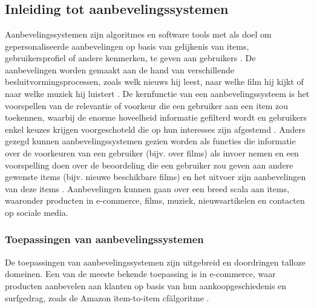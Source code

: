 \chapter{}%
\label{ch:stand-van-zaken}



\section{Inleiding tot aanbevelingssystemen}
Aanbevelingssystemen zijn algoritmes en software tools met als doel om gepersonaliseerde aanbevelingen op basis van gelijkenis van items, gebruikersprofiel of andere kenmerken, te geven aan gebruikers \autocite{Patel2020, Patel2023}. De aanbevelingen worden gemaakt aan de hand van verschillende besluitvormingsprocessen, zoals welk nieuws hij leest, naar welke film hij kijkt of naar welke muziek hij luistert \autocite{Patel2017}. De kernfunctie van een aanbevelingssysteem is het voorspellen van de relevantie of voorkeur die een gebruiker aan een item zou toekennen, waarbij de enorme hoveelheid informatie gefilterd wordt en gebruikers enkel keuzes krijgen voorgeschoteld die op hun interesses zijn afgestemd \autocite{Fkih2022}. Anders gezegd kunnen aanbevelingssystemen gezien worden als functies die informatie over de voorkeuren van een gebruiker (bijv. over films) als invoer nemen en een voorspelling doen over de beoordeling die een gebruiker zou geven aan andere gewenste items (bijv. nieuwe beschikbare films) en het uitvoer zijn aanbevelingen van deze items \autocite{Milano2020}. Aanbevelingen kunnen gaan over een breed scala aan items, waaronder producten in e-commerce, films, muziek, nieuwsartikelen en contacten op sociale media.
\subsection{Toepassingen van aanbevelingssystemen}
De toepassingen van aanbevelingssystemen zijn uitgebreid en doordringen talloze domeinen. Een van de meeste bekende toepassing is in e-commerce, waar producten aanbevelen aan klanten op basis van hun aankoopgeschiedenis en surfgedrag, zoals de Amazon \"item-to-item \ac{cf}\" algoritme \autocite{Patel2023, Patel2020}.

